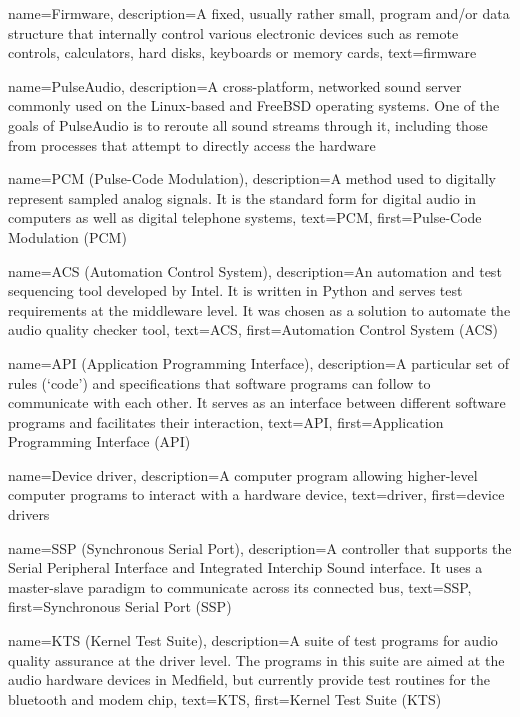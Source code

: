 {
  name=Firmware,
  description={A fixed, usually rather small, program and/or data
    structure that internally control various electronic devices such
    as remote controls, calculators, hard disks, keyboards or memory
    cards},
  text=firmware
}


{
  name=PulseAudio,
  description={A cross-platform, networked sound server commonly used
    on the Linux-based and FreeBSD operating systems. One of the goals
    of PulseAudio is to reroute all sound streams through it,
    including those from processes that attempt to directly access the
    hardware}
}

{
  name=PCM (Pulse-Code Modulation),
  description={A method used to digitally represent sampled analog
    signals. It is the standard form for digital audio in computers as
    well as digital telephone systems},
  text=PCM,
  first=Pulse-Code Modulation (PCM)
}

{
  name=ACS (Automation Control System),
  description={An automation and test sequencing tool developed by
    Intel. It is written in Python and serves test requirements at the
    middleware level. It was chosen as a solution to automate the
    audio quality checker tool},
  text=ACS,
  first=Automation Control System (ACS)
}

{
  name=API (Application Programming Interface),
  description={A particular set of rules (`code') and specifications
    that software programs can follow to communicate with each
    other. It serves as an interface between different software
    programs and facilitates their interaction},
  text=API,
  first=Application Programming Interface (API)
}

{
  name=Device driver,
  description={A computer program allowing higher-level computer
    programs to interact with a hardware device},
  text=driver,
  first=device drivers
}

{
  name=SSP (Synchronous Serial Port),
  description={A controller that supports the Serial Peripheral
    Interface and Integrated Interchip Sound interface. It uses a
    master-slave paradigm to communicate across its connected bus},
  text=SSP,
  first=Synchronous Serial Port (SSP)
}


{
  name=KTS (Kernel Test Suite),
  description={A suite of test programs for audio quality assurance at
    the driver level. The programs in this suite are aimed at the
    audio hardware devices in Medfield, but currently provide test
    routines for the bluetooth and modem chip},
  text=KTS,
  first=Kernel Test Suite (KTS)
}

